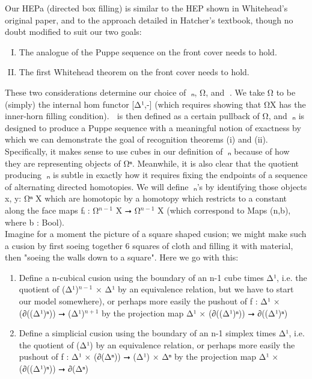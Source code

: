 \documentclass{book}
\theoremstyle{definition}
\begin{document}
Our HEPa (directed box filling) is similar to the HEP shown in Whitehead's original paper, and to the approach detailed in Hatcher's textbook, though no doubt modified to suit our two goals:

\begin{enumerate}[(I)]
\item The analogue of the Puppe sequence on the front cover needs to hold.
\item The first Whitehead theorem on the front cover needs to hold.
\end{enumerate}

These two considerations determine our choice of π⃗ₙ, Ω⃗, and ω⃗. We take Ω⃗ to be (simply) the internal hom functor [Δ¹,-] (which requires showing that Ω⃗X has the inner-horn filling condition). ω⃗ is then defined as a certain pullback of Ω⃗, and π⃗ₙ is designed to produce a Puppe sequence with a meaningful notion of exactness by which we can demonstrate the goal of recognition theorems (i) and (ii). Specifically, it makes sense to use cubes in our definition of π⃗ₙ because of how they are representing objects of Ω⃗ⁿ. Meanwhile, it is also clear that the quotient producing π⃗ₙ is subtle in exactly how it requires fixing the endpoints of a sequence of alternating directed homotopies. We will define π⃗ₙ's by identifying those objects x, y: Ω⃗ⁿ X which are homotopic by a homotopy which restricts to a constant along the face maps fᵢ : Ω⃗${}^{n-1}$ X ⭢ Ω⃗${}^{n-1}$ X (which correspond to Maps (n,b), where b : Bool).\\

Imagine for a moment the picture of a square shaped cusion; we might make such a cusion by first soeing together 6 squares of cloth and filling it with material, then "soeing the walls down to a square". Here we go with this:

\begin{enumerate}
\item Define a n-cubical cusion using the boundary of an n-1 cube times Δ¹, i.e. the quotient of (Δ¹)${}^{n-1}$ × Δ¹ by an equivalence relation, but we have to start our model somewhere), or perhaps more easily the pushout of f : Δ¹ × (∂((Δ¹)ⁿ)) ⭢ (Δ¹)${}^{n+1}$ by the projection map Δ¹ × (∂((Δ¹)ⁿ)) ⭢ ∂((Δ¹)ⁿ)
\item Define a simplicial cusion using the boundary of an n-1 simplex times Δ¹, i.e. the quotient of (Δ¹) by an equivalence relation, or perhaps more easily the pushout of f : Δ¹ × (∂(Δⁿ)) ⭢ (Δ¹) × Δⁿ by the projection map Δ¹ × (∂((Δ¹)ⁿ)) ⭢ ∂(Δⁿ)
\end{enumerate}
\end{document}
